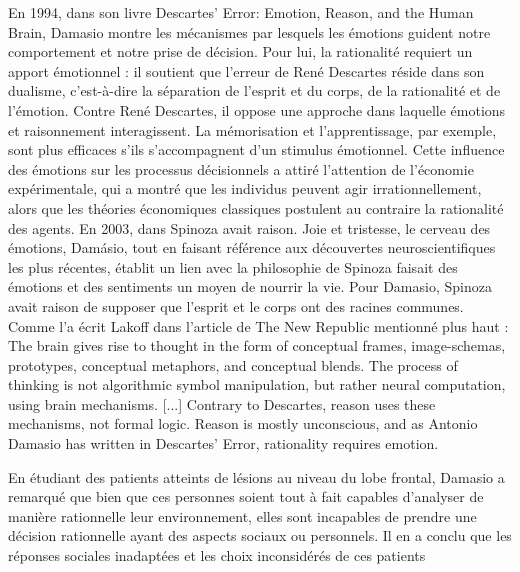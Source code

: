  En 1994, dans son livre Descartes’ Error: Emotion, Reason, and the Human Brain, Damasio montre les mécanismes par lesquels les émotions guident notre comportement et notre prise de décision. Pour lui, la rationalité requiert un apport émotionnel : il soutient que l’erreur de René Descartes réside dans son dualisme, c’est-à-dire la séparation de l’esprit et du corps, de la rationalité et de l'émotion. Contre René Descartes, il oppose une approche dans laquelle émotions et raisonnement interagissent. La mémorisation et l’apprentissage, par exemple, sont plus efficaces s’ils s’accompagnent d’un stimulus émotionnel. Cette influence des émotions sur les processus décisionnels a attiré l'attention de l’économie expérimentale, qui a montré que les individus peuvent agir irrationnellement, alors que les théories économiques classiques postulent au contraire la rationalité des agents. En 2003, dans Spinoza avait raison. Joie et tristesse, le cerveau des émotions, Damásio, tout en faisant référence aux découvertes neuroscientifiques les plus récentes, établit un lien avec la philosophie de Spinoza faisait des émotions et des sentiments un moyen de nourrir la vie. Pour Damasio, Spinoza avait raison de supposer que l’esprit et le corps ont des racines communes. Comme l’a écrit Lakoff dans l’article de The New Republic mentionné plus haut : The brain gives rise to thought in the form of conceptual frames, image-schemas, prototypes, conceptual metaphors, and conceptual blends. The process of thinking is not algorithmic symbol manipulation, but rather neural computation, using brain mechanisms. [...] Contrary to Descartes, reason uses these mechanisms, not formal logic. Reason is mostly unconscious, and as Antonio Damasio has written in Descartes’ Error, rationality requires emotion.\par

 En étudiant des patients atteints de lésions au niveau du lobe frontal, Damasio a remarqué que bien que ces personnes soient tout à fait capables d’analyser de manière rationnelle leur environnement, elles sont incapables de prendre une décision rationnelle ayant des aspects sociaux ou personnels. Il en a conclu que les réponses sociales inadaptées et les choix inconsidérés de ces patients\par

